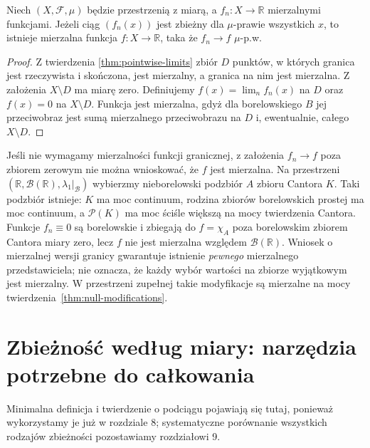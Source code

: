 \begin{wniosek}\label{idx:06:wniosek:15}

Niech $(X,\mathcal F,\mu)$ będzie przestrzenią z miarą,
a $f_n:X\to\mathbb R$ mierzalnymi funkcjami.
Jeżeli ciąg $(f_n(x))$ jest zbieżny dla
$\mu$-prawie wszystkich $x$, to istnieje
mierzalna funkcja $f:X\to\mathbb R$, taka że
$f_n\to f$ $\mu$-p.w.
\end{wniosek}
\begin{proof}
Z twierdzenia \ref{thm:pointwise-limits} zbiór $D$
punktów, w których granica jest rzeczywista i
skończona, jest mierzalny, a granica na nim jest mierzalna.
Z założenia $X\setminus D$ ma miarę zero.
Definiujemy $f(x)=\lim_nf_n(x)$ na $D$ oraz
$f(x)=0$ na $X\setminus D$. Funkcja jest mierzalna,
gdyż dla borelowskiego $B$ jej przeciwobraz jest
sumą mierzalnego przeciwobrazu na $D$ i,
ewentualnie, całego $X\setminus D$.
\end{proof}

\begin{uwaga}
\label{rem:noncomplete-ae-limit-6}
Jeśli nie wymagamy mierzalności funkcji granicznej,
z założenia $f_n\to f$ poza zbiorem zerowym nie można
wnioskować, że $f$ jest mierzalna. Na przestrzeni
$(\mathbb R,\mathcal B(\mathbb R),\lambda_1|_{\mathcal B})$
wybierzmy nieborelowski podzbiór $A$ zbioru Cantora $K$.
Taki podzbiór istnieje: $K$ ma moc continuum,
rodzina zbiorów borelowskich prostej ma moc continuum,
a $\mathcal P(K)$ ma moc ściśle większą na mocy
twierdzenia Cantora.
Funkcje $f_n\equiv0$ są borelowskie i zbiegają do
$f=\chi_A$ poza borelowskim zbiorem Cantora miary zero,
lecz $f$ nie jest mierzalna względem $\mathcal B(\mathbb R)$.
Wniosek o mierzalnej wersji granicy gwarantuje istnienie
\emph{pewnego} mierzalnego przedstawiciela; nie oznacza,
że każdy wybór wartości na zbiorze wyjątkowym jest
mierzalny. W przestrzeni zupełnej takie modyfikacje są
mierzalne na mocy twierdzenia~\ref{thm:null-modifications}.
\end{uwaga}

\section{Zbieżność według miary: narzędzia potrzebne do całkowania}
Minimalna definicja i twierdzenie o podciągu pojawiają się tutaj,
ponieważ wykorzystamy je już w rozdziale 8; systematyczne porównanie
wszystkich rodzajów zbieżności pozostawiamy rozdziałowi 9.


